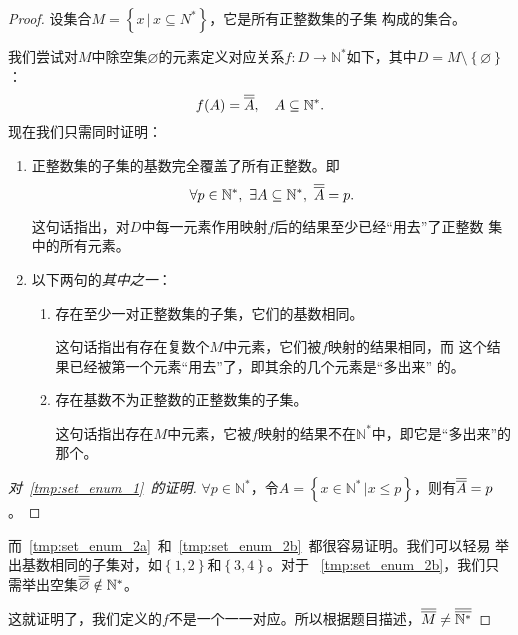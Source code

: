 \begin{proof}
    设集合$M=\left\{ x\,|\, x\subseteq N^\ast \right\}$，它是所有正整数集的子集
    构成的集合。

    我们尝试对$M$中除空集$\varnothing$的元素定义对应关系$f:D\rightarrow 
    \mathbb{N}^\ast$如下，其中$D=M\setminus \left\{ \varnothing \right\} $：
    \[
        f(A) = \overline{\overline{{A}}},\quad A\subseteq \mathbb{N}^\ast.
    \]
    现在我们只需同时证明：
    \begin{enumerate}[label=(\roman*)]
        \item 正整数集的子集的基数完全覆盖了所有正整数。即
            \[
                \forall p\in \mathbb{N}^\ast,\ \exists A\subseteq \mathbb{N}
                ^\ast,\ \overline{\overline{{A}}} = p.
            \] \label{tmp:set_enum_1}

            这句话指出，对$D$中每一元素作用映射$f$后的结果至少已经“用去”了正整数
            集中的所有元素。

        \item 以下两句的\emph{其中之一}：
            \begin{enumerate}
                \item 存在至少一对正整数集的子集，它们的基数相同。\label{tmp:set_enum_2a}
                    
                    这句话指出有存在复数个$M$中元素，它们被$f$映射的结果相同，而
                    这个结果已经被第一个元素“用去”了，即其余的几个元素是“多出来”
                    的。

                \item 存在基数不为正整数的正整数集的子集。\label{tmp:set_enum_2b}

                    这句话指出存在$M$中元素，它被$f$映射的结果不在$\mathbb{N}
                    ^\ast$中，即它是“多出来”的那个。
            \end{enumerate}
    \end{enumerate}
    \begin{proof}[对~\ref{tmp:set_enum_1}~的证明]
        $\forall p \in \mathbb{N}^\ast$，令$A = \left\{ x\in\mathbb{N}^\ast\,
        |x \le p\right\} $，则有$\overline{\overline{{A}}}=p$。
    \end{proof}
    而~\ref{tmp:set_enum_2a}~和~\ref{tmp:set_enum_2b}~都很容易证明。我们可以轻易
    举出基数相同的子集对，如$\left\{ 1,2 \right\}$和$\left\{ 3,4 \right\}$。对于
    ~\ref{tmp:set_enum_2b}，我们只需举出空集$\overline{\overline{{\varnothing}}} \notin 
    \mathbb{N}^\ast$。

    这就证明了，我们定义的$f$不是一个一一对应。所以根据题目描述，$\overline{\overline{{M}}}
    \neq\overline{\overline{{\mathbb{N}^\ast}}}$
\end{proof}

